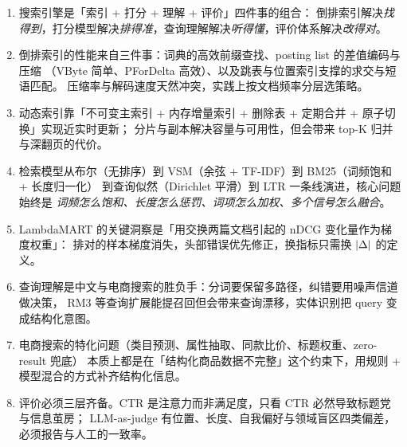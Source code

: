 \begin{keypoint}[本章要点回顾]
\begin{enumerate}
  \item 搜索引擎是「索引 + 打分 + 理解 + 评价」四件事的组合：
        倒排索引解决\emph{找得到}，打分模型解决\emph{排得准}，查询理解解决\emph{听得懂}，评价体系解决\emph{改得对}。
  \item 倒排索引的性能来自三件事：词典的高效前缀查找、posting list 的差值编码与压缩
        （VByte 简单、PForDelta 高效）、以及跳表与位置索引支撑的求交与短语匹配。
        压缩率与解码速度天然冲突，实践上按文档频率分层选策略。
  \item 动态索引靠「不可变主索引 + 内存增量索引 + 删除表 + 定期合并 + 原子切换」实现近实时更新；
        分片与副本解决容量与可用性，但会带来 top-K 归并与深翻页的代价。
  \item 检索模型从布尔（无排序）到 VSM（余弦 + TF-IDF）到 BM25（词频饱和 + 长度归一化）
        到查询似然（Dirichlet 平滑）到 LTR 一条线演进，核心问题始终是
        \emph{词频怎么饱和、长度怎么惩罚、词项怎么加权、多个信号怎么融合}。
  \item LambdaMART 的关键洞察是「用交换两篇文档引起的 nDCG 变化量作为梯度权重」：
        排对的样本梯度消失，头部错误优先修正，换指标只需换 $\left\lvert \Delta \right\rvert$ 的定义。
  \item 查询理解是中文与电商搜索的胜负手：分词要保留多路径，纠错要用噪声信道做决策，
        RM3 等查询扩展能提召回但会带来查询漂移，实体识别把 query 变成结构化意图。
  \item 电商搜索的特化问题（类目预测、属性抽取、同款比价、标题权重、zero-result 兜底）
        本质上都是在「结构化商品数据不完整」这个约束下，用规则 + 模型混合的方式补齐结构化信息。
  \item 评价必须三层齐备。CTR 是注意力而非满足度，只看 CTR 必然导致标题党与信息茧房；
        LLM-as-judge 有位置、长度、自我偏好与领域盲区四类偏差，必须报告与人工的一致率。
\end{enumerate}
\end{keypoint}

